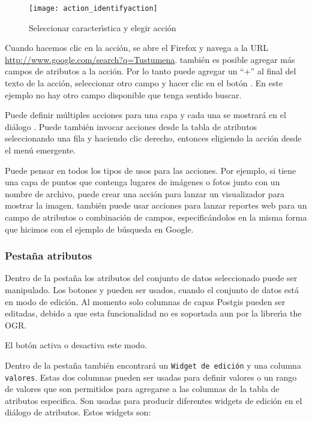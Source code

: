 \begin{figure}[H]
   \begin{center}
   \caption{Seleccionar caracter\'{\i}stica y elegir acci\'on \nixcaption}\label{fig:identify_action}\smallskip
   \texttt{[image: action\_identifyaction]} 
\end{center}  
\end{figure}

Cuando hacemos clic en la acci\'on, se abre el Firefox y navega a la URL
\url{http://www.google.com/search?q=Tustumena}. también es posible agregar más 
campos de atributos a la acci\'on. Por lo tanto puede agregar un ``+'' al final del texto de la acci\'on, 
seleccionar otro campo y hacer clic en el bot\'on . En este ejemplo no
hay otro campo disponible que tenga sentido buscar.

Puede definir m\'ultiples acciones para una capa y cada una se mostrar\'a en el
di\'alogo . Puede también invocar acciones desde la tabla de atributos
seleccionando una fila y haciendo clic derecho, entonces eligiendo la acci\'on desde el men\'u
emergente.

Puede pensar en todos los tipos de usos para las acciones. Por ejemplo, si tiene una capa de puntos
que contenga lugares de im\'agenes o fotos junto con un nombre de archivo, puede
crear una acci\'on para lanzar un visualizador para mostrar la imagen. también puede usar
acciones para lanzar reportes web para un campo de atributos o combinaci\'on de
campos, especific\'andolos en la misma forma que hicimos con el ejemplo de b\'usqueda en Google.

\subsubsection{Pesta\~na atributos}\label{label_attributes}
Dentro de la pesta\~na  los atributos del conjunto de datos seleccionado puede ser manipulado.
Los botones  y  pueden ser usados,
cuando el conjunto de datos est\'a en modo de edici\'on. Al momento solo columnas
de capas Postgis pueden ser editadas, debido a que esta funcionalidad no es soportada aun 
por la librer\'{\i}a the OGR. 

El bot\'on  activa o desactiva este modo.


Dentro de la pesta\~na  también encontrar\'a un \texttt{Widget de edici\'on} y una columna 
\texttt{valores}. Estas dos columnas pueden ser usadas para definir valores o un rango 
de valores que son permitidos para agregarse a las columnas de la tabla de atributos especifica. 
Son usadas para producir diferentes widgets de edici\'on en el di\'alogo de atributos. Estos 
widgets son:

